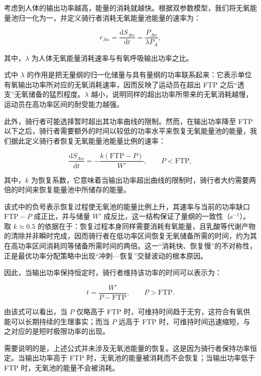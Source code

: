 \documentclass[11pt,a4paper]{ctexart}
\begin{document}
考虑到人体的输出功率越高，能量的消耗就越快。根据双参数模型，我们将无氧能量池归一化为一，并定义骑行者消耗无氧能量池能量的速率为：

\begin{equation}
r_{An} = \frac{\mathrm{d}S_{An}}{\mathrm{d}t} = \frac{P_{An}}{\lambda P_A},
\end{equation}

其中，$\lambda$ 为人体无氧能量消耗速率与有氧呼吸输出功率之比。

式中 $\lambda$ 的作用是把无量纲的归一化储量与具有量纲的功率联系起来：它表示单位有氧输出功率所对应的无氧消耗速率，因而反映了运动员在超出 FTP 之后“透支”无氧储备的猛烈程度。$\lambda$ 越小，说明同样的超出功率所带来的无氧消耗越慢，运动员在高功率区间的耐受能力越强。

此外，骑行者可能选择暂时超出其功率曲线的限制。然而，在输出功率降至 FTP 以下之后，骑行者需要额外的时间以较低的功率水平来恢复无氧能量池的能量，我们据此定义骑行者恢复无氧能量池能量比例的速率：

\begin{equation}
\frac{\mathrm{d}S_{An}}{\mathrm{d}t} = -\frac{k\left(\mathrm{FTP} - P\right)}{W'}, \qquad P < \mathrm{FTP},
\end{equation}

其中，$k$ 为恢复系数，它意味着当输出功率超出曲线的限制时，骑行者大约需要两倍的时间来恢复能量池中所储存的能量。

该式中的负号表示恢复过程使无氧池的能量比例上升，其速率与当前的功率缺口 $\mathrm{FTP} - P$ 成正比，并与储量 $W'$ 成反比，这一结构保证了量纲的一致性（s$^{-1}$）。取 $k \approx 0.5$ 的依据在于：恢复过程本身同样需要消耗有氧能量，且乳酸等代谢产物的清除并非瞬时完成，因而骑行者在低功率区间恢复无氧储备所需的时间，约为其在高功率区间消耗同等储备所需时间的两倍。这一“消耗快、恢复慢”的不对称性，正是最优功率分配策略中出现“冲刺—恢复”交替波动的根本原因。

因此，当输出功率保持恒定时，骑行者维持该功率的时间可以表示为：

\begin{equation}
t = \frac{W'}{P - \mathrm{FTP}}, \qquad P > \mathrm{FTP}.
\end{equation}

由该式可以看出，当 $P$ 仅略高于 FTP 时，可维持时间趋于无穷，这符合有氧供能可以长期持续的生理事实；而当 $P$ 远高于 FTP 时，可维持时间迅速缩短，与之对应的是短时极限功率的出现。

需要说明的是，上述公式并未涉及无氧池能量的恢复。这是因为骑行者保持功率恒定。当输出功率高于 FTP 时，无氧池的能量被消耗而不会恢复；当输出功率低于 FTP 时，无氧池的能量不会被消耗。
\end{document}

